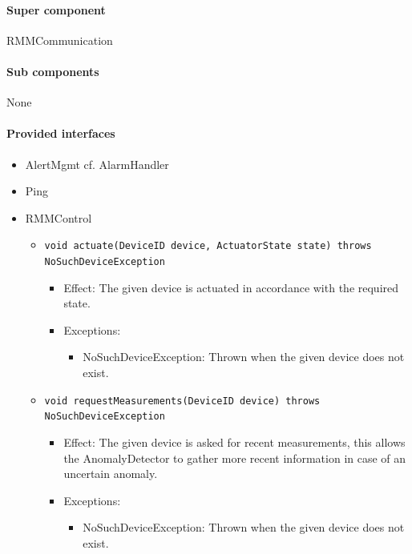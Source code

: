 \documentclass[a4paper,10pt]{article}
\begin{document}
\paragraph{Super component} RMMCommunication

\paragraph{Sub components} None

\paragraph{Provided interfaces}
\begin{itemize}
    \item AlertMgmt cf. AlarmHandler
	
    \item Ping

	\item RMMControl
    \begin{itemize}
    	\item \texttt{void actuate(DeviceID device, ActuatorState state) throws NoSuchDeviceException}
        \begin{itemize}
            \item Effect: The given device is actuated in accordance with the required state.
            \item Exceptions:
            \begin{itemize}
            	\item NoSuchDeviceException: Thrown when the given device does not exist.
            \end{itemize}
		\end{itemize}
    
        \item \texttt{void requestMeasurements(DeviceID device) throws NoSuchDeviceException}
        \begin{itemize}
            \item Effect: The given device is asked for recent measurements, this allows the AnomalyDetector to gather more recent information in case of an uncertain anomaly.
            \item Exceptions:
            \begin{itemize}
            	\item NoSuchDeviceException: Thrown when the given device does not exist.
            \end{itemize}
		\end{itemize}
        

\end{itemize}
\end{itemize}
\end{document}
